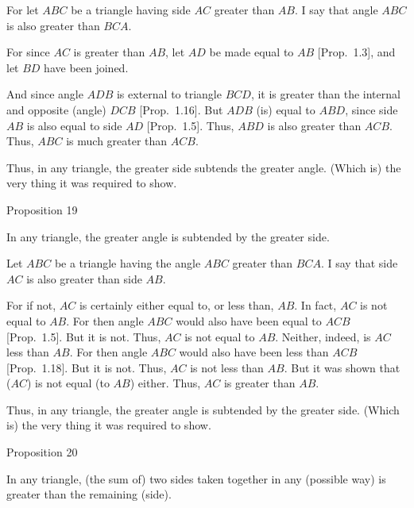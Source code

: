 For let $ABC$ be a triangle having side $AC$ greater than $AB$. I say that
angle $ABC$ is also greater than $BCA$.

For since $AC$ is greater than $AB$, let $AD$ be made equal to $AB$
 [Prop.~1.3],
and let $BD$ have been joined.

And since angle $ADB$ is external to triangle $BCD$, it is greater than the
internal and opposite (angle) $DCB$ [Prop.~1.16]. But $ADB$ (is) equal to $ABD$,
since side $AB$ is also equal to side $AD$ [Prop.~1.5]. Thus,
$ABD$ is also greater than $ACB$. Thus, $ABC$ is much greater than 
$ACB$.

Thus, in any triangle, the greater side subtends the greater angle.
(Which is) the very thing  it was required to show.


\begin{center}
{\large Proposition 19}
\end{center}

In any triangle, the greater angle is subtended by the greater side.

Let $ABC$ be a triangle having the angle $ABC$ greater than $BCA$. I say
that side $AC$ is also greater than side $AB$.

For if not, $AC$ is certainly either equal to, or less than, $AB$. In fact, $AC$ is not
equal to $AB$. For then angle $ABC$  would also have been equal to $ACB$ [Prop.~1.5].
But it is not. Thus, $AC$ is not equal to $AB$.
Neither, indeed, is $AC$ less than $AB$. For then angle $ABC$ would also have been
less than $ACB$ [Prop.~1.18]. But it is not. Thus, $AC$ is not less than
$AB$. But it was  shown that ($AC$) is    not equal (to $AB$) either. Thus, $AC$ 
is greater than $AB$.

\epsfysize=2.7in
\centerline{}

Thus, in any triangle, the greater angle is subtended by the greater side.
(Which is) the very thing it was required to show.


\begin{center}
{\large Proposition 20}
\end{center}

In any triangle, (the sum of) two sides taken together in any (possible way) is greater than the remaining (side).

\epsfysize=2.2in
\centerline{}

